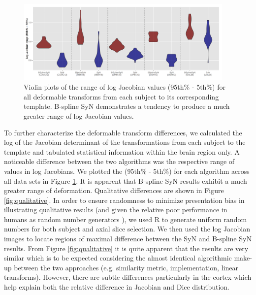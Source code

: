 \documentclass{frontiersSCNS}
\begin{document}
\begin{figure}[htb]
  \centering
    \includegraphics[width=0.95\textwidth]{jacobianRange.jpg}
  \caption{Violin plots of the range of log Jacobian values 
           (95th\% - 5th\%)  
           for all deformable
           transforms from each subject to its corresponding
           template.  B-spline SyN demonstrates a tendency 
           to produce a much
           greater range of log Jacobian values.
           }
  \label{fig:jacobian}
\end{figure}

To further characterize the deformable transform differences, we 
calculated the log of the Jacobian determinant of the transformations from 
each subject to the template and 
tabulated statistical information within the brain region only. 
A noticeable difference between the two algorithms was the
respective range of values in log Jacobians.  We plotted the 
(95th\% - 5th\%) for each algorithm across all data sets
 in Figure \ref{fig:jacobian}.  It is apparent 
that B-spline SyN results exhibit a much greater range of deformation.
Qualitative differences are shown in Figure \ref{fig:qualitative}.  In order to ensure
randomness to minimize presentation bias in illustrating qualitative results 
(and given the relative poor performance in humans as random number
generators \citep{wagenaar1972}), we used R to generate uniform random numbers for
both subject and axial slice selection.  We then used the log Jacobian
images to locate regions of maximal difference between the SyN and B-spline SyN
results.  From Figure \ref{fig:qualitative} it is quite apparent that the results
are very similar which is to be expected considering the almost identical algorithmic
make-up between the two approaches (e.g. similarity metric, implementation, linear 
transforms).  However, there are subtle differences particularly in the cortex which 
help explain both the relative difference in Jacobian and Dice distribution.
\end{document}
